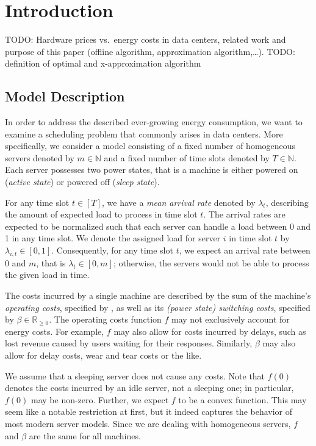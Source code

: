 
\chapter{Introduction}
TODO: Hardware prices vs.\ energy costs in data centers, related work and purpose of this paper (offline algorithm, approximation algorithm,\ldots).
TODO: definition of optimal and x-approximation algorithm

\section{Model Description}\label{sec:model_descr}
In order to address the described ever-growing energy consumption, we want to examine a scheduling problem that commonly arises in data centers. More specifically, we consider a model consisting of a fixed number of homogeneous servers denoted by $m\in\mathbb{N}$ and a fixed number of time slots denoted by $T\in\mathbb{N}$. Each server possesses two power states, that is a machine is either powered on (\textit{active state}) or powered off (\textit{sleep state}).
	
For any time slot $t\in[T]$, we have a \textit{mean arrival rate} denoted by $\lambda_t$, describing the amount of expected load to process in time slot $t$. The arrival rates are expected to be normalized such that each server can handle a load between 0 and 1 in any time slot. We denote the assigned load for server $i$ in time slot $t$ by $\lambda_{i,t}\in[0,1]$. Consequently, for any time slot $t$, we expect an arrival rate between 0 and $m$, that is $\lambda_t\in[0,m]$; otherwise, the servers would not be able to process the given load in time.

The costs incurred by a single machine are described by the sum of the machine's \textit{operating costs}, specified by , as well as its \textit{(power state) switching costs}, specified by $\beta\in\mathbb{R}_{\ge 0}$. 
The operating costs function $f$ may not exclusively account for energy costs. For example, $f$ may also allow for costs incurred by delays, such as lost revenue caused by users waiting for their responses. Similarly, $\beta$ may also allow for delay costs, wear and tear costs or the like.\parencite{dyn-right-sizing}

We assume that a sleeping server does not cause any costs. Note that $f(0)$ denotes the costs incurred by an idle server, not a sleeping one; in particular, $f(0)$ may be non-zero. Further, we expect $f$ to be a convex function. This may seem like a notable restriction at first, but it indeed captures the behavior of most modern server models. Since we are dealing with homogeneous servers, $f$ and $\beta$ are the same for all machines.


